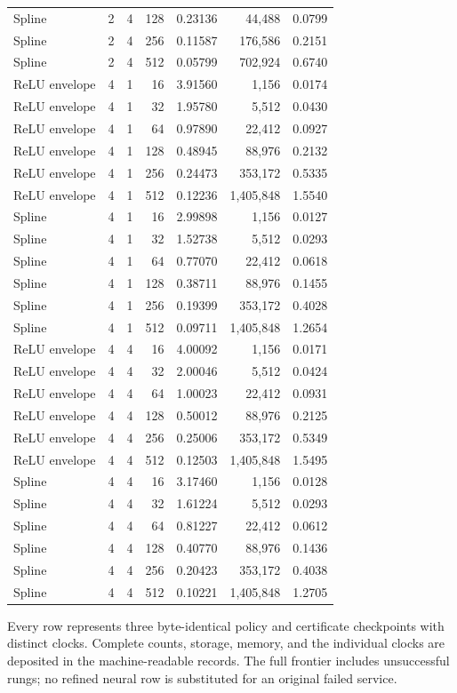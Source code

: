 \begin{longtable}{lrrrrrr}
Spline & 2 & 4 & 128 & 0.23136 & 44,488 & 0.0799 \\
Spline & 2 & 4 & 256 & 0.11587 & 176,586 & 0.2151 \\
Spline & 2 & 4 & 512 & 0.05799 & 702,924 & 0.6740 \\
ReLU envelope & 4 & 1 & 16 & 3.91560 & 1,156 & 0.0174 \\
ReLU envelope & 4 & 1 & 32 & 1.95780 & 5,512 & 0.0430 \\
ReLU envelope & 4 & 1 & 64 & 0.97890 & 22,412 & 0.0927 \\
ReLU envelope & 4 & 1 & 128 & 0.48945 & 88,976 & 0.2132 \\
ReLU envelope & 4 & 1 & 256 & 0.24473 & 353,172 & 0.5335 \\
ReLU envelope & 4 & 1 & 512 & 0.12236 & 1,405,848 & 1.5540 \\
Spline & 4 & 1 & 16 & 2.99898 & 1,156 & 0.0127 \\
Spline & 4 & 1 & 32 & 1.52738 & 5,512 & 0.0293 \\
Spline & 4 & 1 & 64 & 0.77070 & 22,412 & 0.0618 \\
Spline & 4 & 1 & 128 & 0.38711 & 88,976 & 0.1455 \\
Spline & 4 & 1 & 256 & 0.19399 & 353,172 & 0.4028 \\
Spline & 4 & 1 & 512 & 0.09711 & 1,405,848 & 1.2654 \\
ReLU envelope & 4 & 4 & 16 & 4.00092 & 1,156 & 0.0171 \\
ReLU envelope & 4 & 4 & 32 & 2.00046 & 5,512 & 0.0424 \\
ReLU envelope & 4 & 4 & 64 & 1.00023 & 22,412 & 0.0931 \\
ReLU envelope & 4 & 4 & 128 & 0.50012 & 88,976 & 0.2125 \\
ReLU envelope & 4 & 4 & 256 & 0.25006 & 353,172 & 0.5349 \\
ReLU envelope & 4 & 4 & 512 & 0.12503 & 1,405,848 & 1.5495 \\
Spline & 4 & 4 & 16 & 3.17460 & 1,156 & 0.0128 \\
Spline & 4 & 4 & 32 & 1.61224 & 5,512 & 0.0293 \\
Spline & 4 & 4 & 64 & 0.81227 & 22,412 & 0.0612 \\
Spline & 4 & 4 & 128 & 0.40770 & 88,976 & 0.1436 \\
Spline & 4 & 4 & 256 & 0.20423 & 353,172 & 0.4038 \\
Spline & 4 & 4 & 512 & 0.10221 & 1,405,848 & 1.2705 \\
\bottomrule\end{longtable}
Every row represents three byte-identical policy and certificate checkpoints with distinct clocks. Complete counts, storage, memory, and the individual clocks are deposited in the machine-readable records. The full frontier includes unsuccessful rungs; no refined neural row is substituted for an original failed service.
